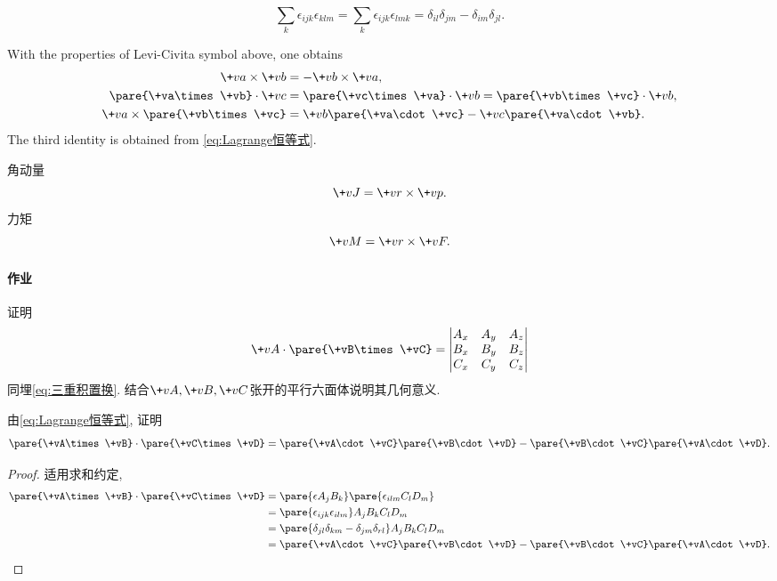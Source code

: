 \documentclass{ctexart}
\begin{document}
\begin{ex}[Lagrange恒等式]
    \begin{equation}
        \label{eq:Lagrange恒等式}
        \sum_k \epsilon_{ijk}\epsilon_{klm} = \sum_k \epsilon_{ijk}\epsilon_{lmk} = \delta_{il}\delta_{jm} - \delta_{im}\delta_{jl}. 
    \end{equation}
\end{ex}
\begin{ex}[矢量积的性质]
    With the properties of Levi-Civita symbol above, one obtains
    \begin{align}
        \+va\times\+vb &= -\+vb\times\+va,\\
        \label{eq:三重积置换}\pare{\+va\times\+vb}\cdot\+vc &= \pare{\+vc\times\+va}\cdot\+vb = \pare{\+vb\times\+vc}\cdot\+vb,\\
        \+va\times\pare{\+vb\times\+vc} &= \+vb\pare{\+va\cdot\+vc} - \+vc\pare{\+va\cdot\+vb}.
    \end{align}
    The third identity is obtained from \eqref{eq:Lagrange恒等式}.
\end{ex}
\begin{ex}
    角动量
    \[ \+vJ = \+vr\times\+vp. \]
    力矩
    \[ \+vM = \+vr\times\+vF. \]
\end{ex}

\paragraph{作业} %
\label{par:作业}

\begin{ex}
    证明
    \[ \+vA\cdot\pare{\+vB\times\+vC} = \begin{vmatrix}
        A_x & A_y & A_z \\
        B_x & B_y & B_z \\
        C_x & C_y & C_z
    \end{vmatrix} \]
    同埋\eqref{eq:三重积置换}. 结合$\+vA,\+vB,\+vC$张开的平行六面体说明其几何意义.
\end{ex}
\begin{ex}
    由\eqref{eq:Lagrange恒等式}, 证明
    \[ \pare{\+vA\times\+vB}\cdot\pare{\+vC\times\+vD} = \pare{\+vA\cdot\+vC}\pare{\+vB\cdot\+vD} - \pare{\+vB\cdot\+vC}\pare{\+vA\cdot\+vD}. \]
\end{ex}
\begin{proof}
    适用求和约定,
    \begin{align*}
        \pare{\+vA\times\+vB} \cdot\pare{\+vC\times\+vD} &= \pare{\epsilon A_jB_k}\pare{\epsilon_{ilm}C_lD_m} \\
        &= \pare{\epsilon_{ijk}\epsilon_{ilm}}A_jB_kC_lD_m \\
        &= \pare{\delta_{jl}\delta_{km} - \delta_{jm}\delta_{rl}}A_jB_kC_lD_m \\
        &= \pare{\+vA\cdot\+vC}\pare{\+vB\cdot\+vD} - \pare{\+vB\cdot\+vC}\pare{\+vA\cdot\+vD}. \qedhere
    \end{align*}
\end{proof}
\end{document}
